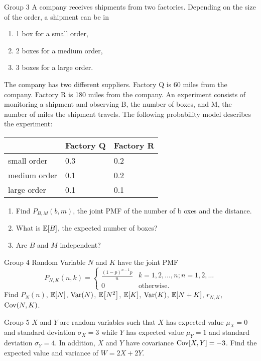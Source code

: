 \documentclass{article}
\begin{document}
\begin{problem}
    {Group 3}
    A company receives shipments from two factories. Depending on the size of the order, a shipment can be in
    \begin{enumerate}
        \item 1 box for a small order,
        \item 2 boxes for a medium order,
        \item 3 boxes for a large order.
    \end{enumerate}
    The company has two different suppliers. Factory Q is 60 miles from the company. Factory R is 180 miles from the company. An experiment consists of monitoring a shipment and observing B, the number of boxes, and M, the number of miles the shipment travels. The following probability model describes the experiment:
    \begin{table}[H]
        \centering
        \begin{tabular}{|l|l|l|}
        \hline
                     & Factory Q & Factory R \\ \hline
        small order  & 0.3       & 0.2       \\ \hline
        medium order & 0.1       & 0.2       \\ \hline
        large order  & 0.1       & 0.1       \\ \hline
        \end{tabular}
    \end{table}
    \begin{enumerate}
        \item Find $P_{B,M}(b,m)$, the joint PMF of the number of b oxes and the distance.
        \item What is $\E{B}$, the expected number of boxes?
        \item Are $B$ and $M$ independent?
    \end{enumerate}
\end{problem}

\begin{problem}
    {Group 4}
    Random Variable $N$ and $K$ have the joint PMF
    \[
    P_{N,K}(n,k)={
        \begin{cases}
            \frac{(1-p)^{n-1}p}{n} & k=1,2,\ldots,n; n=1,2,\ldots\\
            0 & \text{otherwise.}
        \end{cases}
    }
    \]
    Find $P_N(n)$, $\E{N}$, $\mathop{\mathrm{Var}}\nolimits(N)$, $\E{N^2}$, $\E{K}$, $\mathop{\mathrm{Var}}\nolimits(K)$, $\E{N+K}$, $r_{N,K}$, $\mathop{\mathrm{Cov}}\nolimits(N,K)$.
\end{problem}

\begin{problem}
    {Group 5}
    $X$ and $Y$ are random variables such that $X$ has expected value $\mu_X = 0$ and standard deviation $\sigma_X = 3$ while $Y$ has expected value $\mu_Y = 1$ and standard deviation $\sigma_Y = 4$. In addition, $X$ and $Y$ have covariance $\mathop{\mathrm{Cov}}\nolimits[X, Y] = -3$. Find the expected value and variance of $W = 2X+2Y$.
\end{problem}
\end{document}
